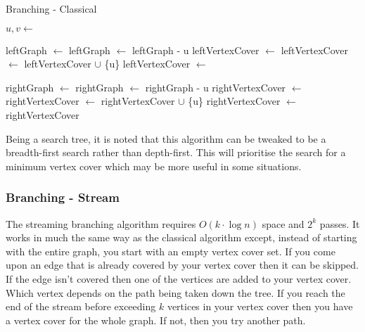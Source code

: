 \begin{algorithm}[htb]
    \caption{Branching - Classical}
    \label{alg:branching_classical}
    \DontPrintSemicolon

    \Func
    {
    }
    {
        $u, v \gets$ \;

        leftGraph $\gets$ \;
        leftGraph $\gets$ leftGraph - u\;
        leftVertexCover $\gets$ \;
        leftVertexCover $\gets$ leftVertexCover $\cup$ \{u\}\;
        leftVertexCover $\gets$ \;

        rightGraph $\gets$ \;
        rightGraph $\gets$ rightGraph - u\;
        rightVertexCover $\gets$ \;
        rightVertexCover $\gets$ rightVertexCover $\cup$ \{u\}\;
        rightVertexCover $\gets$ \;
        \Return rightVertexCover
    }
\end{algorithm}

Being a search tree, it is noted that this algorithm can be tweaked to be a
breadth-first search rather than depth-first. This will prioritise the search
for a minimum vertex cover which may be more useful in some situations.

\subsubsection{Branching - Stream}

The streaming branching algorithm requires \(O(k\cdot \log n)\) space and \(2^k\)
passes. It works in much the same way as the classical algorithm except,
instead of starting with the entire graph, you start with an empty vertex cover
set. If you come upon an edge that is already covered by your vertex cover then
it can be skipped. If the edge isn't covered then one of the vertices are added
to your vertex cover. Which vertex depends on the path being taken down the
tree. If you reach the end of the stream before exceeding \(k\) vertices in
your vertex cover then you have a vertex cover for the whole graph. If not,
then you try another path.

